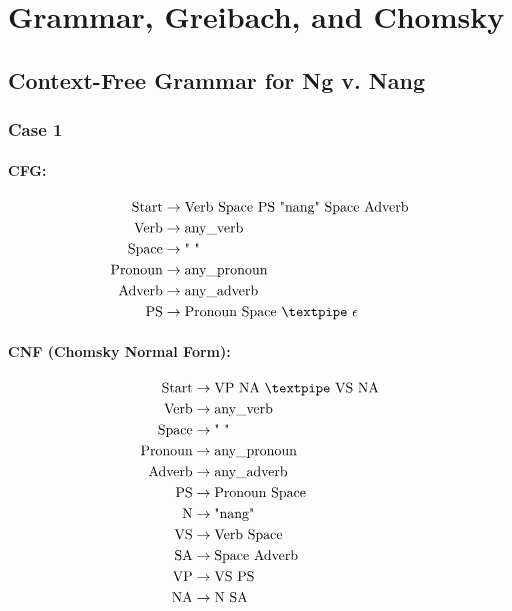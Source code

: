 \section{Grammar, Greibach, and Chomsky}
\subsection{Context-Free Grammar for Ng v. Nang}
\subsubsection{Case 1}

\paragraph{CFG:}

\begin{equation*}
    \begin{aligned}
        \text{Start} &\rightarrow \text{Verb Space PS "nang" Space Adverb} \\
        \text{Verb} &\rightarrow \text{any\_verb} \\
        \text{Space} &\rightarrow \text{" "} \\
        \text{Pronoun} &\rightarrow \text{any\_pronoun} \\
        \text{Adverb} &\rightarrow \text{any\_adverb} \\
        \text{PS} &\rightarrow \text{Pronoun Space {\textpipe} } \epsilon
    \end{aligned}
\end{equation*}

\paragraph{CNF (Chomsky Normal Form):}

\begin{equation*}
    \begin{aligned}
        \text{Start} &\rightarrow \text{VP NA {\textpipe} VS NA} \\
        \text{Verb} &\rightarrow \text{any\_verb} \\
        \text{Space} &\rightarrow \text{" "} \\
        \text{Pronoun} &\rightarrow \text{any\_pronoun} \\
        \text{Adverb} &\rightarrow \text{any\_adverb} \\
        \text{PS} &\rightarrow \text{Pronoun Space} \\
        \text{N} &\rightarrow \text{"nang"} \\
        \text{VS} &\rightarrow \text{Verb Space} \\
        \text{SA} &\rightarrow \text{Space Adverb} \\
        \text{VP} &\rightarrow \text{VS PS} \\
        \text{NA} &\rightarrow \text{N SA}
    \end{aligned}
\end{equation*}

